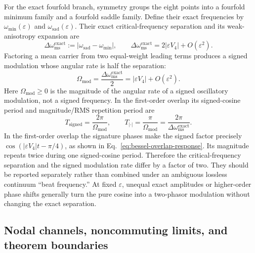 For the exact fourfold branch, symmetry groups the eight points into a
fourfold minimum family and a fourfold saddle family.  Define their exact
frequencies by \(\omega_{\min}(\varepsilon)\) and
\(\omega_{\mathrm{sad}}(\varepsilon)\).  Their exact critical-frequency
separation and its weak-anisotropy expansion are
\begin{equation}
  \Delta\omega_{\mathrm{ms}}^{\mathrm{exact}}
  :=|\omega_{\mathrm{sad}}-\omega_{\min}|,
  \qquad
  \Delta\omega_{\mathrm{ms}}^{\mathrm{exact}}
  =2|\varepsilon V_4|+O(\varepsilon^2).
  \label{eq:critical-frequency-separation}
\end{equation}
Factoring a mean carrier from two equal-weight leading terms produces a
signed modulation whose angular rate is half the separation:
\begin{equation}
  \Omega_{\mathrm{mod}}
  =\frac{\Delta\omega_{\mathrm{ms}}^{\mathrm{exact}}}{2}
  =|\varepsilon V_4|+O(\varepsilon^2).
  \label{eq:signed-modulation-rate}
\end{equation}
Here \(\Omega_{\mathrm{mod}}\ge0\) is the magnitude of the angular rate of a
signed oscillatory modulation, not a signed frequency.  In the first-order
overlap its signed-cosine period and magnitude/RMS repetition period are
\begin{equation}
  T_{\mathrm{signed}}=\frac{2\pi}{\Omega_{\mathrm{mod}}},
  \qquad
  T_{|\cdot|}=\frac{\pi}{\Omega_{\mathrm{mod}}}
  =\frac{2\pi}{\Delta\omega_{\mathrm{ms}}^{\mathrm{exact}}}.
  \label{eq:modulation-periods}
\end{equation}
In the first-order overlap the signature phases make the signed factor
precisely \(\cos(|\varepsilon V_4|t-\pi/4)\), as shown in
Eq.~\eqref{eq:bessel-overlap-response}.  Its magnitude repeats twice during
one signed-cosine period.  Therefore the critical-frequency separation and
the signed modulation rate differ by a factor of two.  They should be
reported separately rather than combined under an ambiguous lossless
continuum ``beat frequency.''  At fixed \(\varepsilon\), unequal exact
amplitudes or higher-order phase shifts generally turn the pure cosine into
a two-phasor modulation without changing the exact separation.

\subsection{Nodal channels, noncommuting limits, and theorem boundaries}
\label{rem:nodal-channels}

